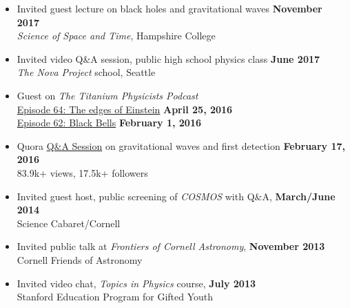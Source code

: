 \documentclass[margin,line]{res}
\begin{document}
\begin{resume}
\begin{itemize}
\item[] Invited guest lecture on black holes and gravitational waves \hfill {\bf November 2017} \\
\hspace*{1em} {\it Science of Space and Time}, Hampshire College

\item[] Invited video Q\&A session, public high school physics class \hfill {\bf June 2017} \\
\hspace*{1em} {\it The Nova Project} school, Seattle \\

\item[] Guest on {\it The Titanium Physicists Podcast} \\
\hspace*{1em} \href{http://titaniumphysicists.brachiolopemedia.com/2016/04/25/episode-64-e-and-n-the-edges-of-einstein/}{Episode 64: The edges of Einstein}
\hfill
{\bf April 25, 2016} \\
\hspace*{1em} \href{http://titaniumphysicists.brachiolopemedia.com/2016/02/01/episode-62-black-bells-with-brent-knopf-and-matt-sheehy/}{Episode 62: Black Bells}
\hfill
{\bf February 1, 2016} \\

\item[] Quora \href{https://www.quora.com/session/Leo-C-Stein/1}{Q\&A Session} on gravitational waves and first detection
  \hfill {\bf February 17, 2016} \\
\hspace*{1em} 83.9k+ views, 17.5k+ followers \\

\item[] Invited guest host, public screening of {\it COSMOS} with Q\&A,
  \hfill {\bf March/June 2014} \\
\hspace*{1em} Science Cabaret/Cornell
\item[] Invited public talk at {\it Frontiers of Cornell Astronomy}, \hfill {\bf November 2013} \\
\hspace*{1em} Cornell Friends of Astronomy
\item[] Invited video chat, {\it Topics in Physics} course, \hfill {\bf July 2013} \\
\hspace*{1em} Stanford Education Program for Gifted Youth
\end{itemize}


\end{resume}
\end{document}
